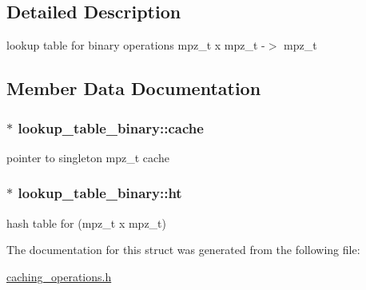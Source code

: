 \subsection{Detailed Description}
lookup table for binary operations mpz\+\_\+t x mpz\+\_\+t -\/$>$ mpz\+\_\+t 

\subsection{Member Data Documentation}
\subsubsection[{\texorpdfstring{cache}{cache}}]{$\ast$ lookup\+\_\+table\+\_\+binary\+::cache}\hypertarget{structlookup__table__binary_ad68f0a417fc2f1e237bfc5077d5f68c6}{}\label{structlookup__table__binary_ad68f0a417fc2f1e237bfc5077d5f68c6}
pointer to singleton mpz\+\_\+t cache 
\subsubsection[{\texorpdfstring{ht}{ht}}]{$\ast$ lookup\+\_\+table\+\_\+binary\+::ht}\hypertarget{structlookup__table__binary_ae12894f1b36d77b08582558701d25029}{}\label{structlookup__table__binary_ae12894f1b36d77b08582558701d25029}
hash table for (mpz\+\_\+t x mpz\+\_\+t) 

The documentation for this struct was generated from the following file\+:\begin{DoxyCompactItemize}
\item 
\hyperlink{caching__operations_8h}{caching\+\_\+operations.\+h}\end{DoxyCompactItemize}
